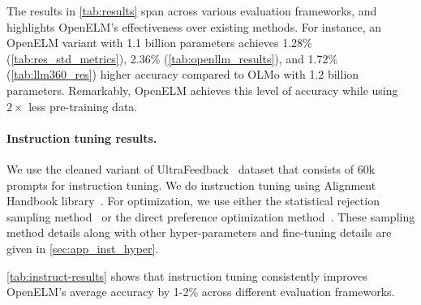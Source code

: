 \documentclass[10pt,twocolumn,letterpaper]{article}
\makeatletter
\newcommand{\model}{OpenELM\@\xspace}
\makeatother
\begin{document}
The results in \cref{tab:results} span across various evaluation frameworks, and highlights \model's effectiveness over existing methods. For instance, an \model variant with 1.1 billion parameters achieves 1.28\% (\cref{tab:res_std_metrics}), 2.36\% (\cref{tab:openllm_results}), and 1.72\% (\cref{tab:llm360_res}) higher accuracy compared to OLMo with 1.2 billion parameters. Remarkably, \model achieves this level of accuracy while using $2\times$ less pre-training data.

\paragraph{Instruction tuning results.} We use the cleaned variant of UltraFeedback~\cite{cui2023ultrafeedback,notus2023} dataset that consists of 60k prompts for instruction tuning. We do instruction tuning using Alignment Handbook library~\cite{alignment_handbook2023}. For optimization, we use either the statistical rejection sampling method~\cite{liuStatisticalRejectionSampling2024} or the direct preference optimization method~\cite{rafailovDirectPreferenceOptimization2023}. These sampling method details along with other hyper-parameters and fine-tuning details are given in \cref{sec:app_inst_hyper}. 

\cref{tab:instruct-results} shows that instruction tuning consistently improves \model's average accuracy by 1-2\% across different evaluation frameworks.
\end{document}
